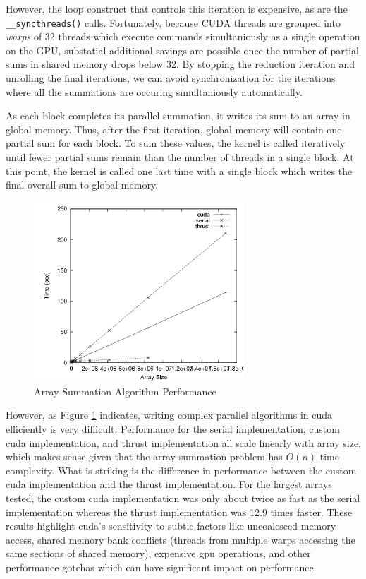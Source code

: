 \documentclass{article}
\begin{document}
However, the loop construct that controls this iteration is expensive, as are the \verb!__syncthreads()! calls. Fortunately, because CUDA threads are grouped into \emph{warps} of 32 threads which execute commands simultaniously as a single operation on the GPU, substatial additional savings are possible once the number of partial sums in shared memory drops below 32. By stopping the reduction iteration and unrolling the final iterations, we can avoid synchronization for the iterations where all the summations are occuring simultaniously automatically.

As each block completes its parallel summation, it writes its sum to an array in global memory. Thus, after the first iteration, global memory will contain one partial sum for each block. To sum these values, the kernel is called iteratively until fewer partial sums remain than the number of threads in a single block. At this point, the kernel is called one last time with a single block which writes the final overall sum to global memory.

\begin{figure}
\centering
\includegraphics[width=0.7\textwidth]{data/summation_plot.png}
\caption{Array Summation Algorithm Performance}
\label{summation_plot}
\end{figure}

However, as Figure \ref{summation_plot} indicates, writing complex parallel algorithms in cuda efficiently is very difficult. Performance for the serial implementation, custom cuda implementation, and thrust implementation all scale linearly with array size, which makes sense given that the array summation problem has \(O(n)\) time complexity. What is striking is the difference in performance between the custom cuda implementation and the thrust implementation. For the largest arrays tested, the custom cuda implementation was only about twice as fast as the serial implementation whereas the thrust implementation was 12.9 times faster. These results highlight cuda's sensitivity to subtle factors like uncoalesced memory access, shared memory bank conflicts (threads from multiple warps accessing the same sections of shared memory), expensive gpu operations, and other performance gotchas which can have significant impact on performance.\cite{bestprac}
\end{document}

